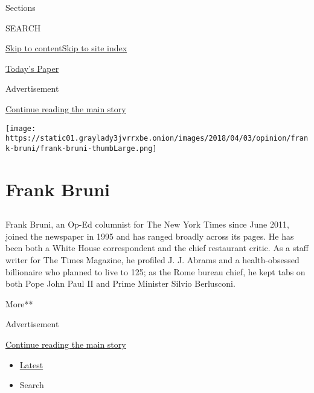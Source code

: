 Sections

SEARCH

\protect\hyperlink{site-content}{Skip to
content}\protect\hyperlink{site-index}{Skip to site index}

\href{https://myaccount.nytimes3xbfgragh.onion/auth/login?response_type=cookie\&client_id=vi}{}

\href{https://www.nytimes3xbfgragh.onion/section/todayspaper}{Today's
Paper}

Advertisement

\protect\hyperlink{after-top}{Continue reading the main story}

\texttt{[image: https://static01.graylady3jvrrxbe.onion/images/2018/04/03/opinion/frank-bruni/frank-bruni-thumbLarge.png]}

\hypertarget{frank-bruni}{%
\section{Frank Bruni}\label{frank-bruni}}

\hypertarget{section}{%
\subsection{}\label{section}}

Frank Bruni, an Op-Ed columnist for The New York Times since June 2011,
joined the newspaper in 1995 and has ranged broadly across its pages. He
has been both a White House correspondent and the chief restaurant
critic. As a staff writer for The Times Magazine, he profiled J. J.
Abrams and a health-obsessed billionaire who planned to live to 125; as
the Rome bureau chief, he kept tabs on both Pope John Paul II and Prime
Minister Silvio Berlusconi.

More**

Advertisement

\protect\hyperlink{after-mid1}{Continue reading the main story}

\begin{itemize}
\tightlist
\item
  \protect\hyperlink{stream-panel}{Latest}
\item
  Search
\end{itemize}

